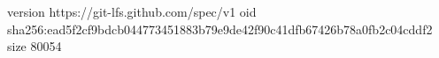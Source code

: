 version https://git-lfs.github.com/spec/v1
oid sha256:ead5f2cf9bdcb044773451883b79e9de42f90c41dfb67426b78a0fb2c04cddf2
size 80054
